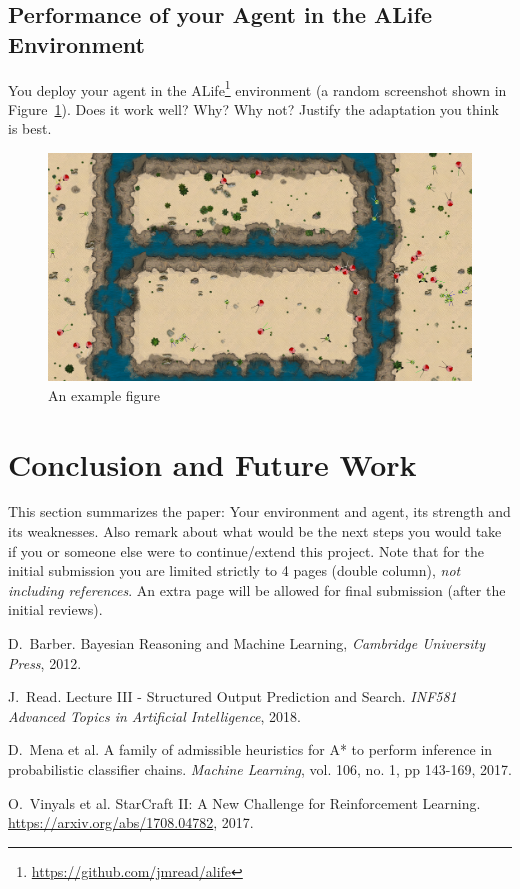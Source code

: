 \documentclass[journal, a4paper]{IEEEtran}
\begin{document}
\subsection{Performance of your Agent in the ALife Environment}

You deploy your agent in the ALife\footnote{\url{https://github.com/jmread/alife}} environment (a random screenshot shown in Figure~\ref{a_figure}). Does it work well? Why? Why not? Justify the adaptation you think is best.

\begin{figure}[h]
	\centering
	\includegraphics[width=0.8\columnwidth]{alife.png}
	\caption{\label{a_figure}An example figure}
\end{figure}


\section{Conclusion and Future Work}
	This section summarizes the paper: Your environment and agent, its strength and its weaknesses. Also remark about what would be the next steps you would take if you or someone else were to continue/extend this project. 
	Note that for the initial submission you are limited strictly to 4 pages (double column), \emph{not including references}. An extra page will be allowed for final submission (after the initial reviews). 

\begin{thebibliography}{4}

	D.~Barber. Bayesian Reasoning and Machine Learning,
	{\em Cambridge University Press}, 2012.

		J.~Read. Lecture III - Structured Output Prediction and Search. \textit{INF581 Advanced Topics in Artificial Intelligence}, 2018.

	D.~Mena et al. A family of admissible heuristics for A* to perform inference in probabilistic classifier chains.
	{\em Machine Learning}, vol. 106, no. 1, pp 143-169, 2017.

	O.~Vinyals et al. StarCraft {II:} {A} New Challenge for Reinforcement Learning.
	\url{https://arxiv.org/abs/1708.04782}, 2017. 

\end{thebibliography}

\end{document}
